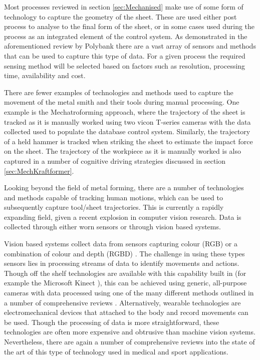 Most processes reviewed in section \ref{sec:Mechanised} make use of some form of technology to capture the geometry of the sheet. These are used either post process to analyse to the final form of the sheet, or in some cases used during the process as an integrated element of the control system. As demonstrated in the aforementioned review by Polybank \citep{Allwood2016Closed-loopForming} there are a vast array of sensors and methods that can be used to capture this type of data. For a given process the required sensing method will be selected based on factors such as resolution, processing time, availability and cost. 

There are fewer examples of technologies and methods used to capture the movement of the metal smith and their tools during manual processing. One example is the Mechatroforming approach, where the trajectory of the sheet is tracked as it is manually worked  \citep{Ilangovan2016AnForming} using two vicon T-series cameras with the data collected used to populate the database control system. Similarly, the trajectory of a held hammer is tracked when striking the sheet to estimate the impact force on the sheet. The trajectory of the workpiece as it is manually worked is also captured in a number of cognitive driving strategies discussed in section \ref{sec:MechKraftformer}. 

Looking beyond the field of metal forming, there are a number of technologies and methods capable of tracking human motions, which can be used to subsequently capture tool/sheet trajectories. This is currently a rapidly expanding field, given a recent explosion in computer vision research. Data is collected through either worn sensors or through vision based systems.

Vision based systems collect data from sensors capturing colour (RGB) or a combination of colour and depth (RGBD) \citep{Zhang2019AMethods}. The challenge in using these types sensors lies in processing streams of data to identify movements and actions. Though off the shelf technologies are available with this capability built in (for example the Microsoft Kinect \citep{Shotton2011Real-timeImages}), this can be achieved using generic, all-purpose cameras with data processed using one of the many different methods outlined in a number of comprehensive reviews \citep{Zhang2019AMethods,Beddiar2020Vision-basedSurvey}. Alternatively, wearable technologies are electromechanical devices that attached to the body and record movements can be used. Though the processing of data is more straightforward, these technologies are often more expensive and obtrusive than machine vision systems. Nevertheless, there are again a number of comprehensive reviews into the state of the art of this type of technology used in medical \citep{Homayounfar2020WearableChallenges} and sport \citep{Taborri2020SportOverview} applications.

